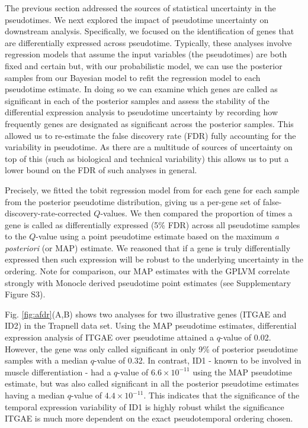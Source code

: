 The previous section addressed the sources of statistical uncertainty in the pseudotimes. We next explored the impact of pseudotime uncertainty on downstream analysis. Specifically, we focused on the identification of genes that are differentially expressed across pseudotime. Typically, these analyses involve regression models that assume the input variables (the pseudotimes) are both fixed and certain but, with our probabilistic model, we can use the posterior samples from our Bayesian model to refit the regression model to each pseudotime estimate. In doing so we can examine which genes are called as significant in each of the posterior samples and assess the stability of the differential expression analysis to pseudotime uncertainty by recording how frequently genes are designated as significant across the posterior samples. This allowed us to re-estimate the false discovery rate (FDR)  fully accounting for the variability in pseudotime. As there are a multitude of sources of uncertainty on top of this (such as biological and technical variability) this allows us to put a lower bound on the FDR of such analyses in general.

Precisely, we fitted the tobit regression model from \cite{Trapnell2014} for each gene for each sample from the posterior pseudotime distribution, giving us a per-gene set of false-discovery-rate-corrected $Q$-values. We then compared the proportion of times a gene is called as differentially expressed (5\% FDR) across all pseudotime samples to the $Q$-value using a point pseudotime estimate based on the maximum \textit{a posteriori} (or MAP) estimate. We reasoned that if a gene is truly differentially expressed then such expression will be robust to the underlying uncertainty in the ordering. Note for comparison, our MAP estimates with the GPLVM correlate strongly with Monocle derived pseudotime point estimates (see Supplementary Figure S3).

Fig. \ref{fig:afdr}(A,B) shows two analyses for two illustrative genes  (ITGAE and ID2) in the Trapnell data set. Using the MAP pseudotime estimates, differential expression analysis of ITGAE over pseudotime attained a $q$-value of 0.02. However, the gene was only called significant in only 9\% of posterior pseudotime samples with a median $q$-value of 0.32. In contrast, ID1 - known to be involved in muscle differentiation - had a $q$-value of $6.6 \times 10^{-11}$ using the MAP pseudotime estimate, but was also called  significant in all the posterior pseudotime estimates having a median $q$-value of $4.4 \times 10^{-11}$. This indicates that the significance of the temporal expression variability of ID1 is highly robust whilst the significance ITGAE is much more dependent on the exact pseudotemporal ordering chosen.

